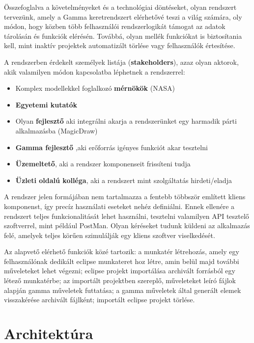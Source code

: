 Összefoglalva a követelményeket és a technológiai döntéseket, olyan rendszert tervezünk, amely a Gamma keretrendszert elérhetővé teszi a világ számára, oly módon, hogy közben több felhasználói rendszerlogikát támogat az adatok tárolásán és funkciók elérésén. Továbbá, olyan mellék funkciókat is biztosítania kell, mint inaktív projektek automatizált törlése vagy felhasználók értesítése.

A rendszerben érdekelt személyek listája (\textbf{stakeholders}), azaz olyan aktorok, akik valamilyen módon kapcsolatba léphetnek a rendszerrel:
\begin{itemize}
	\item Komplex modellekkel foglalkozó \textbf{mérnökök} (NASA)
	\item \textbf{Egyetemi kutatók}
	\item Olyan \textbf{fejlesztő} aki integrálni akarja a rendszerünket egy harmadik párti alkalmazásba (MagicDraw)
	\item \textbf{Gamma fejlesztő} ,aki erőforrás igényes funkciót akar tesztelni
	\item \textbf{Üzemeltető}, aki a rendszer komponenseit frissíteni tudja
	\item \textbf{Üzleti oldalú kolléga}, aki a rendszert mint szolgáltatás hirdeti/eladja
\end{itemize}

A rendszer jelen formájában nem tartalmazza a fentebb többször említett kliens komponenst, így precíz használati eseteket nehéz definiálni. Ennek ellenére a rendszert teljes funkcionalitását lehet használni, tesztelni valamilyen API tesztelő szoftverrel, mint például PostMan. Olyan kéréseket tudunk küldeni az alkalmazás felé, amelyek teljes körűen szimulálják egy kliens szoftver viselkedését.

Az alapvető elérhető funkciók közé tartozik: a munkatér létrehozás, amely egy felhasználónak dedikált eclipse munkateret hoz létre, amin belül majd további műveleteket lehet végezni; eclipse projekt importálása archivált forrásból egy létező munkatérbe; az importált projektben szereplő, műveleteket leíró fájlok alapján gamma műveletek futtatása; a gamma műveletek által generált elemek visszakérése archivált fájlként; importált eclipse projekt törlése.


\section{Architektúra}

